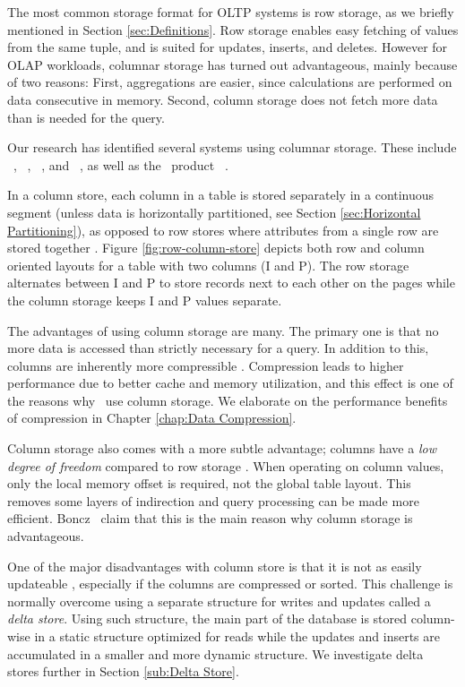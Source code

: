 The most common storage format for OLTP systems is row storage, as we briefly mentioned in Section \ref{sec:Definitions}. Row storage enables easy fetching of values from the same tuple, and is suited for updates, inserts, and deletes. However for OLAP workloads, columnar storage has turned out advantageous, mainly because of two reasons: First, aggregations are easier, since calculations are performed on data consecutive in memory. Second, column storage does not fetch more data than is needed for the query.

Our research has identified several systems using columnar storage. These include \monetdb~\cite{Boncz2005-wj, Boncz2002-yj}, \cstore~\cite{Stonebraker2005-qz}, \saph~\cite{Farber2012-vh}, and \mssql~\cite{noauthor_undated-vq, Larson2013-mc}, as well as the \bd~product \tableau~\cite{Kamkolkar2015-iq}.

In a column store, each column in a table is stored separately in a continuous segment (unless data is horizontally partitioned, see Section \ref{sec:Horizontal Partitioning}), as opposed to row stores where attributes from a single row are stored together \cite{Bjorklund2011-wh}. Figure \ref{fig:row-column-store} depicts both row and column oriented layouts for a table with two columns (I and P). The row storage alternates between I and P to store records next to each other on the pages while the column storage keeps I and P values separate. 

The advantages of using column storage are many. The primary one is that no more data is accessed than strictly necessary for a query. In addition to this, columns are inherently more compressible \cite{noauthor_undated-vq}. Compression leads to higher performance due to better cache and memory utilization, and this effect is one of the reasons why \mssql~use column storage. We elaborate on the performance benefits of compression in Chapter \ref{chap:Data Compression}.

Column storage also comes with a more subtle advantage; columns have a \textit{low degree of freedom} compared to row storage \cite{Boncz2005-wj}. When operating on column values, only the local memory offset is required, not the global table layout. This removes some layers of indirection and query processing can be made more efficient. Boncz \ea~claim that this is the main reason why column storage is advantageous.


One of the major disadvantages with column store is that it is not as easily updateable \cite{Bjorklund2011-wh}, especially if the columns are compressed or sorted. This challenge is normally overcome using a separate structure for writes and updates called a \textit{delta store}. Using such structure, the main part of the database is stored column-wise in a static structure optimized for reads while the updates and inserts are accumulated in a smaller and more dynamic structure. We investigate delta stores further in Section \ref{sub:Delta Store}.

